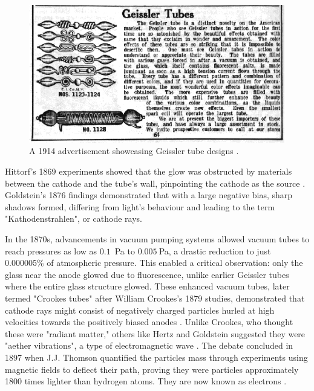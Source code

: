 \begin{refsection}
\begin{figure}[H]
\centering
\includegraphics[width=\linewidth]{Chapter1/gfx/geissler1.png}
\caption{A 1914 advertisement showcasing Geissler tube designs \cite{electro1914}.}
\label{fig:geissler}
\end{figure}

Hittorf's 1869 experiments showed that the glow was obstructed by materials between the cathode and the tube's wall, pinpointing the cathode as the source \cite{hittorf:1869}. Goldstein's 1876 findings demonstrated that with a large negative bias, sharp shadows formed, differing from light's behaviour and leading to the term "Kathodenstrahlen", or cathode rays.

In the 1870s, advancements in vacuum pumping systems allowed vacuum tubes to reach pressures as low as $0.1$~\si{\pascal} to $0.005~$\si{\pascal}, a drastic reduction to just 0.000005\% of atmospheric pressure. This enabled a critical observation: only the glass near the anode glowed due to fluorescence, unlike earlier Geissler tubes where the entire glass structure glowed. These enhanced vacuum tubes, later termed "Crookes tubes" after William Crookes's 1879 studies, demonstrated that cathode rays might consist of negatively charged particles hurled at high velocities towards the positively biased anodes \cite{crookes1879}. Unlike Crookes, who thought these were "radiant matter," others like Hertz and Goldstein suggested they were "aether vibrations", a type of electromagnetic wave \cite{thomson:1903}. The debate concluded in 1897 when J.J. Thomson quantified the particles mass through experiments using magnetic fields to deflect their path, proving they were particles approximately 1800 times lighter than hydrogen atoms. They are now known as electrons \cite{thomson:1901}.


\end{refsection}
